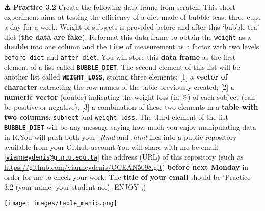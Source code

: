 \documentclass[
]{article}
\begin{document}
\textbf{⚠ Practice 3.2} Create the following data frame from scratch.
This short experiment aims at testing the efficiency of a diet made of
bubble teas: three cups a day for a week. Weight of subjects is provided
before and after this `bubble tea' diet (\textbf{the data are fake}).
Reformat this data frame to obtain the \texttt{weight} as a
\textbf{double} into one column and the \texttt{time} of measurement as
a factor with two levels \texttt{before\_diet} and \texttt{after\_diet}.
You will store this \textbf{data frame} as the first element of a list
called \textbf{\texttt{BUBBLE\_DIET}}. The second element of this list
will be another list called \textbf{\texttt{WEIGHT\_LOSS}}, storing
three elements: {[}1{]} a \textbf{vector of character} extracting the
row names of the table previously created; {[}2{]} a \textbf{numeric
vector} (double) indicating the weight loss (in \%) of each subject (can
be positive or negative); {[}3{]} a combination of these two elements in
a \textbf{table with two columns}: \texttt{subject} and
\texttt{weight\_loss}. The third element of the list
\textbf{\texttt{BUBBLE\_DIET}} will be any message saying how much you
enjoy manipulating data in R.You will push both your \emph{.Rmd} and
\emph{.html} files into a public repository available from your Github
account.You will share with me be email
{[}\href{mailto:vianneydenis@g.ntu.edu.tw}{\nolinkurl{vianneydenis@g.ntu.edu.tw}}{]}
the address (URL) of this repository (such as
\url{https://github.com/vianneydenis/OCEAN5098.git}) \textbf{before next
Monday} in order for me to check your work. The \textbf{title of your
email } should be `Practice 3.2 (your name: your student no.). ENJOY ;)

\texttt{[image: images/table\_manip.png]}
\end{document}
